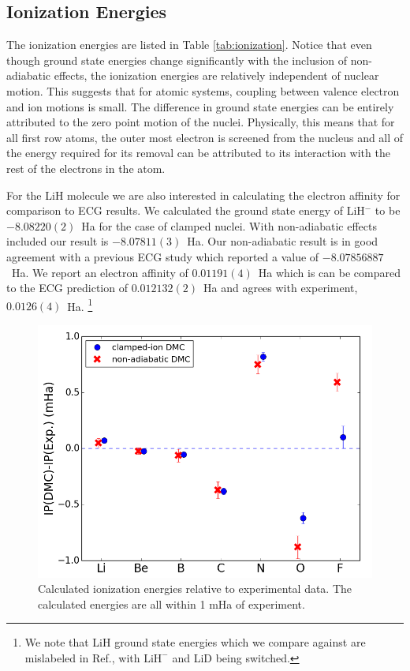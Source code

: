 \documentclass[pra,superscriptaddress,groupedaddress,twocolumn]{revtex4}
\begin{document}
\subsection{Ionization Energies}

The ionization energies are listed in Table \ref{tab:ionization}.  Notice that even though ground state energies change significantly with the inclusion of non-adiabatic effects, the ionization energies are relatively independent of nuclear motion. This suggests that for atomic systems, coupling between valence electron and ion motions is small. The difference in ground state energies can be entirely attributed to the zero point motion of the nuclei. Physically, this means that for all first row atoms, the outer most electron is screened from the nucleus and all of the energy required for its removal can be attributed to its interaction with the rest of the electrons in the atom.

For the LiH molecule we are also interested in calculating the electron affinity for comparison to ECG results. We calculated the ground state energy of LiH$^-$ to be $-8.08220(2)$~Ha for the case of clamped nuclei.  With non-adiabatic effects included our result is  $-8.07811(3)$~Ha. Our non-adiabatic result is in good agreement with a previous ECG study \cite{Bubin_LiH_noBO} which reported a value of $-8.07856887$~Ha. We report an electron affinity of $0.01191(4)$~Ha which is can be compared to the ECG prediction of $0.012132(2)$~Ha and agrees with experiment, $0.0126(4)$~Ha. \footnote{We note that LiH ground state energies which we compare against are mislabeled in Ref.\cite{Bubin_LiH_noBO}, with $\text{LiH}^-$ and LiD being switched.}

\begin{figure}
\centering
\includegraphics[scale=.4]{Figures/ionization}
\caption{Calculated ionization energies relative to experimental data. The calculated energies are all within 1 mHa of experiment.}
\end{figure}
\end{document}

